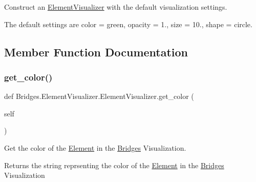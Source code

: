 Construct an \mbox{\hyperlink{class_bridges_1_1_element_visualizer_1_1_element_visualizer}{Element\+Visualizer}} with the default visualization settings. 

The default settings are color = green, opacity = 1., size = 10., shape = circle. 

\subsection{Member Function Documentation}
\mbox{\label{class_bridges_1_1_element_visualizer_1_1_element_visualizer_ad53e64fed8aa62244cf0f83f2d7c2dcf}} 
\subsubsection{\texorpdfstring{get\+\_\+color()}{get\_color()}}
{\footnotesize\ttfamily def Bridges.\+Element\+Visualizer.\+Element\+Visualizer.\+get\+\_\+color (\begin{DoxyParamCaption}\item[{}]{self }\end{DoxyParamCaption})}



Get the color of the \mbox{\hyperlink{namespace_bridges_1_1_element}{Element}} in the \mbox{\hyperlink{namespace_bridges_1_1_bridges}{Bridges}} Visualization. 

\begin{DoxyReturn}{Returns}
the string reprsenting the color of the \mbox{\hyperlink{namespace_bridges_1_1_element}{Element}} in the \mbox{\hyperlink{namespace_bridges_1_1_bridges}{Bridges}} Visualization 
\end{DoxyReturn}
\mbox{\label{class_bridges_1_1_element_visualizer_1_1_element_visualizer_a54a58179a82e3d571069f2918114ce9e}} 
